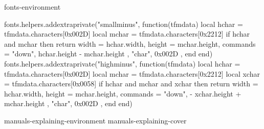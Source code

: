 \startenvironment fonts-environment


    \blockligatures[fi,fl,ff]

    \startbuffer[extraminus]
    \startluacode
        fonts.helpers.addextraprivate("smallminus", function(tfmdata)
            local hchar = tfmdata.characters[0x002D]
            local mchar = tfmdata.characters[0x2212]
            if hchar and mchar then
                return {
                    width    = hchar.width,
                    height   = mchar.height,
                    commands = {
                        { "down", hchar.height - mchar.height },
                        { "char", 0x002D },
                    }
                }
            end
        end)
        fonts.helpers.addextraprivate("highminus", function(tfmdata)
            local hchar = tfmdata.characters[0x002D]
            local mchar = tfmdata.characters[0x2212]
            local xchar = tfmdata.characters[0x0058]
            if hchar and mchar and xchar then
                return {
                    width    = hchar.width,
                    height   = mchar.height,
                    commands = {
                        { "down", - xchar.height + mchar.height },
                        { "char", 0x002D },
                    }
                }
            end
        end)
    \stopluacode
    \stopbuffer

    \getbuffer[extraminus]


    \environment manuals-explaining-environment
    \environment manuals-explaining-cover

    \enabledirectives[visualizers.fraction=2]






\stopenvironment
